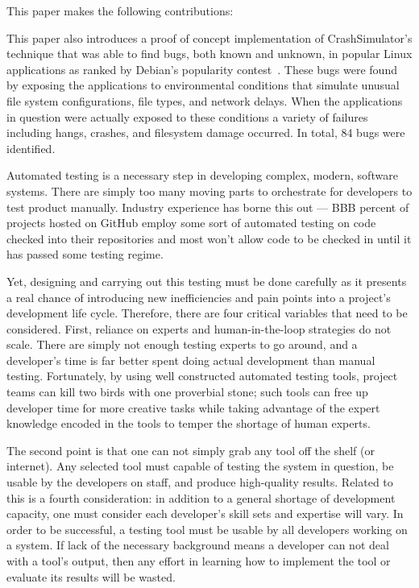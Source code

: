 This paper makes the following contributions:

This paper also introduces a proof of concept implementation of
CrashSimulator's technique that was able to find bugs, both known and
unknown, in popular Linux applications as ranked by Debian's popularity
contest~\cite{DebPopCon}.  These bugs were found by exposing the
applications to environmental conditions that simulate unusual file system
configurations, file types, and network delays.  When the applications in
question were actually exposed to these conditions a variety of failures
including hangs, crashes, and filesystem damage occurred.  In total, 84
bugs were identified.


 Automated testing
is a necessary step in developing complex, modern, software systems.  There
are simply too many moving parts to orchestrate for developers to test
product manually.
Industry experience has borne this out --- BBB percent of projects hosted
on GitHub employ some sort of automated testing on code checked into their
repositories and most won't allow code to be checked in until it has passed
some testing regime.

Yet, designing and carrying out this testing must be done carefully as it
presents a real chance of introducing new inefficiencies and pain points
into a project's development life cycle.  Therefore, there are four
critical variables that need to be considered.
First, reliance on experts and
human-in-the-loop strategies do not scale.  There are
simply not enough testing experts to go around,
and a developer's time is far
better spent doing actual development than manual testing.  Fortunately, by using well constructed automated
testing tools, project teams can kill two birds with one proverbial stone;
such tools can free up developer time for more creative tasks while taking
advantage of the expert knowledge encoded in the tools to temper the
shortage of human experts.


The second point is that one can not simply grab any tool off the shelf (or
internet).  Any selected tool must capable of testing the system in
question, be usable by the developers on staff, and produce
high-quality results.  Related to this is a fourth consideration: in
addition to a general shortage of development capacity, one must consider
each developer's skill sets and expertise will vary.
In order to be successful, a
testing tool must be usable by all developers working on a system. If
lack of the necessary background means a developer can not
deal with a tool's output,
then any effort in learning how to implement the tool or  evaluate its
results will be wasted.

